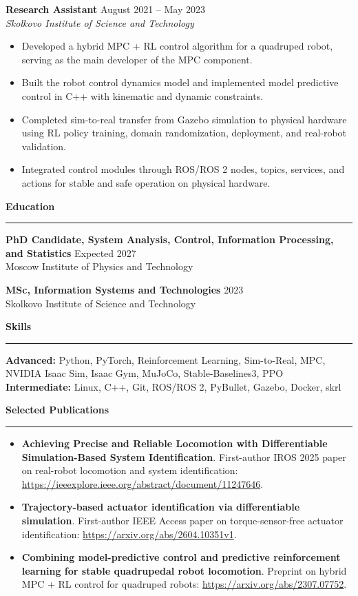 \documentclass[11pt,a4paper]{article}
\newcommand{\cvsection}[1]{%
  \vspace{10pt}
  {\large\textbf{#1}}\\[-2pt]
  \hrule
  \vspace{6pt}
}
\begin{document}
\textbf{Research Assistant} \hfill August 2021 -- May 2023\\
\textit{Skolkovo Institute of Science and Technology}
\begin{itemize}
  \item Developed a hybrid MPC + RL control algorithm for a quadruped robot, serving as the main developer of the MPC component.
  \item Built the robot control dynamics model and implemented model predictive control in C++ with kinematic and dynamic constraints.
  \item Completed sim-to-real transfer from Gazebo simulation to physical hardware using RL policy training, domain randomization, deployment, and real-robot validation.
  \item Integrated control modules through ROS/ROS 2 nodes, topics, services, and actions for stable and safe operation on physical hardware.
\end{itemize}

\cvsection{Education}
\textbf{PhD Candidate, System Analysis, Control, Information Processing, and Statistics} \hfill Expected 2027\\
Moscow Institute of Physics and Technology

\vspace{4pt}
\textbf{MSc, Information Systems and Technologies} \hfill 2023\\
Skolkovo Institute of Science and Technology

\newpage

\cvsection{Skills}
\textbf{Advanced:} Python, PyTorch, Reinforcement Learning, Sim-to-Real, MPC, NVIDIA Isaac Sim, Isaac Gym, MuJoCo, Stable-Baselines3, PPO\\
\textbf{Intermediate:} Linux, C++, Git, ROS/ROS 2, PyBullet, Gazebo, Docker, skrl

\cvsection{Selected Publications}
\begin{itemize}
  \item \textbf{Achieving Precise and Reliable Locomotion with Differentiable Simulation-Based System Identification}. First-author IROS 2025 paper on real-robot locomotion and system identification: \url{https://ieeexplore.ieee.org/abstract/document/11247646}.
  \item \textbf{Trajectory-based actuator identification via differentiable simulation}. First-author IEEE Access paper on torque-sensor-free actuator identification: \url{https://arxiv.org/abs/2604.10351v1}.
  \item \textbf{Combining model-predictive control and predictive reinforcement learning for stable quadrupedal robot locomotion}. Preprint on hybrid MPC + RL control for quadruped robots: \url{https://arxiv.org/abs/2307.07752}.
\end{itemize}
\end{document}
